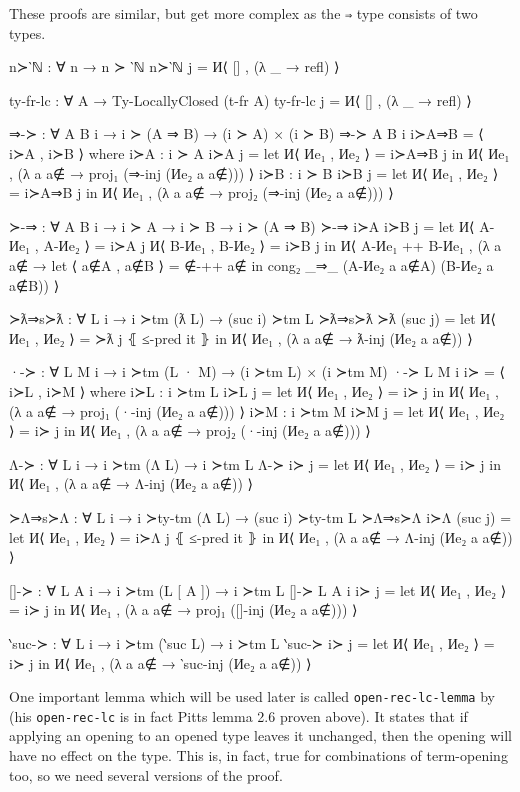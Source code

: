 \documentclass[logo,bsc,singlespacing,parskip,online]{infthesis}
\begin{document}
These proofs are similar, but get more complex as the \texttt{⇒} type consists of two types.
\begin{code}
  n≻‵ℕ : ∀ {n} → n ≻ ‵ℕ
  n≻‵ℕ j = И⟨ [] , (λ _ → refl) ⟩

  ty-fr-lc : ∀ {A} → Ty-LocallyClosed (t-fr A)
  ty-fr-lc j = И⟨ [] , (λ _ → refl) ⟩

  ⇒-≻ : ∀ {A B i} → i ≻ (A ⇒ B) → (i ≻ A) × (i ≻ B)
  ⇒-≻ {A} {B} {i} i≻A⇒B = ⟨ i≻A , i≻B ⟩
    where
      i≻A : i ≻ A
      i≻A j = let И⟨ Иe₁ , Иe₂ ⟩ = i≻A⇒B j
        in И⟨ Иe₁ , (λ a {a∉} → proj₁ (⇒-inj (Иe₂ a {a∉}))) ⟩
      i≻B : i ≻ B
      i≻B j = let И⟨ Иe₁ , Иe₂ ⟩ = i≻A⇒B j
        in И⟨ Иe₁ , (λ a {a∉} → proj₂ (⇒-inj (Иe₂ a {a∉}))) ⟩

  ≻-⇒ : ∀ {A B i} → i ≻ A → i ≻ B → i ≻ (A ⇒ B)
  ≻-⇒ i≻A i≻B j =
    let И⟨ A-Иe₁ , A-Иe₂ ⟩ = i≻A j
        И⟨ B-Иe₁ , B-Иe₂ ⟩ = i≻B j
    in И⟨ A-Иe₁ ++ B-Иe₁ , (λ a {a∉} →
      let ⟨ a∉A , a∉B ⟩ = ∉-++ a∉
      in cong₂ _⇒_ (A-Иe₂ a {a∉A}) (B-Иe₂ a {a∉B})) ⟩

  ≻ƛ⇒s≻ƛ : ∀ {L i} → i ≻tm (ƛ L) → (suc i) ≻tm L
  ≻ƛ⇒s≻ƛ ≻ƛ (suc j) = let И⟨ Иe₁ , Иe₂ ⟩ = ≻ƛ j ⦃ ≤-pred it ⦄
    in И⟨ Иe₁ , (λ a {a∉} → ƛ-inj (Иe₂ a {a∉})) ⟩

  ·-≻ : ∀ {L M i} → i ≻tm (L · M) → (i ≻tm L) × (i ≻tm M)
  ·-≻ {L} {M} {i} i≻ = ⟨ i≻L , i≻M ⟩
    where
      i≻L : i ≻tm L
      i≻L j = let И⟨ Иe₁ , Иe₂ ⟩ = i≻ j
        in И⟨ Иe₁ , (λ a {a∉} → proj₁ (·-inj (Иe₂ a {a∉}))) ⟩
      i≻M : i ≻tm M
      i≻M j = let И⟨ Иe₁ , Иe₂ ⟩ = i≻ j
        in И⟨ Иe₁ , (λ a {a∉} → proj₂ (·-inj (Иe₂ a {a∉}))) ⟩

  Λ-≻ : ∀ {L i} → i ≻tm (Λ L) → i ≻tm L
  Λ-≻ i≻ j = let И⟨ Иe₁ , Иe₂ ⟩ = i≻ j
    in И⟨ Иe₁ , (λ a {a∉} → Λ-inj (Иe₂ a {a∉})) ⟩

  ≻Λ⇒s≻Λ : ∀ {L i} → i ≻ty-tm (Λ L) → (suc i) ≻ty-tm L
  ≻Λ⇒s≻Λ i≻Λ (suc j) = let И⟨ Иe₁ , Иe₂ ⟩ = i≻Λ j ⦃ ≤-pred it ⦄
    in И⟨ Иe₁ , (λ a {a∉} → Λ-inj (Иe₂ a {a∉})) ⟩

  []-≻ : ∀ {L A i} → i ≻tm (L [ A ]) → i ≻tm L
  []-≻ {L} {A} {i} i≻ j = let И⟨ Иe₁ , Иe₂ ⟩ = i≻ j
    in И⟨ Иe₁ , (λ a {a∉} → proj₁ ([]-inj (Иe₂ a {a∉}))) ⟩

  ‵suc-≻ : ∀ {L i} → i ≻tm (‵suc L) → i ≻tm L
  ‵suc-≻ i≻ j = let И⟨ Иe₁ , Иe₂ ⟩ = i≻ j
    in И⟨ Иe₁ , (λ a {a∉} → ‵suc-inj (Иe₂ a {a∉})) ⟩
\end{code}

One important lemma which will be used later is called \texttt{open-rec-lc-lemma} by
\citet{chargueraud_locally_2012} (his \texttt{open-rec-lc} is in fact Pitts lemma 2.6 proven above).
It states that if applying an opening to an opened type leaves it unchanged, then the opening will
have no effect on the type. This is, in fact, true for combinations of term-opening too, so we need
several versions of the proof.
\end{document}
